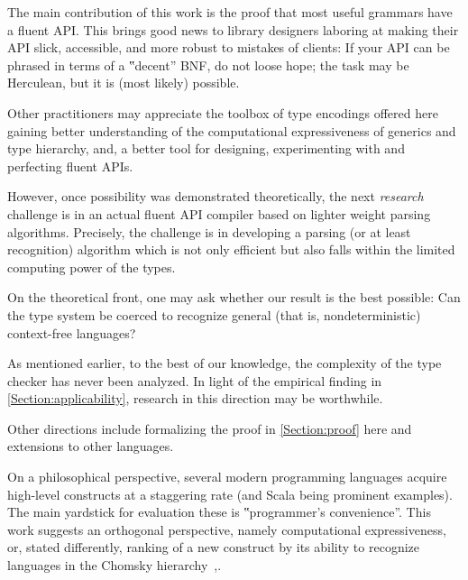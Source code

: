 The main contribution of this work is the proof that
  most useful grammars have a fluent API\@.
This brings good news to library designers laboring
  at making their API slick, accessible, and more
  robust to mistakes of clients:
If your API can be phrased in terms of a ‟decent”
  BNF, do not loose hope; the task may be Herculean, but it is (most likely) possible.

Other practitioners may appreciate the toolbox of type encodings offered here
  gaining better understanding of the computational expressiveness of
  \Java generics and type hierarchy, and, a better tool
  for designing, experimenting with and perfecting fluent APIs.

However, once possibility was demonstrated theoretically, the next \emph{research}
    challenge is in an actual fluent API compiler based on lighter weight
  parsing algorithms.
Precisely, the challenge
  is in developing a parsing (or at least recognition)
  algorithm which is not only efficient but also falls within the limited computing power of the \Java types.

On the theoretical front, one may ask whether
  our result is the best possible:
Can the \Java type system be coerced to recognize
  general (that is, nondeterministic) context-free languages?

As mentioned earlier, to the best of our knowledge,
  the complexity of the \Java type checker has never been analyzed.
In light of the empirical finding in \cref{Section:applicability},
  research in this direction may be worthwhile.

Other directions include
  formalizing the proof in \cref{Section:proof} here and
  extensions to other languages.

On a philosophical perspective, several modern programming languages
  acquire high-level constructs at a staggering rate
  (\CC and Scala being prominent examples).
The main yardstick for evaluation these
  is ‟programmer's convenience”.
This work suggests an orthogonal perspective, namely
  computational expressiveness, or, stated differently,
    ranking of a new construct by its ability to recognize languages
    in the Chomsky hierarchy~\cite{Chomsky:1963},.
